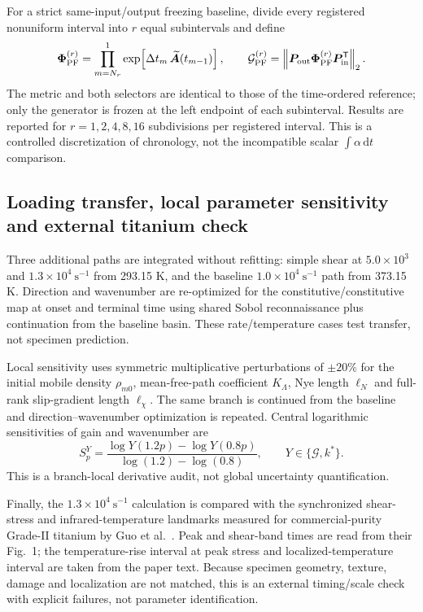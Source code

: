 For a strict same-input/output freezing baseline, divide every registered
nonuniform interval into $r$ equal subintervals and define
\begin{equation}
 \boldsymbol\Phi_{\rm PF}^{(r)}
 =\prod_{m=N_r}^{1}
 \exp\!\left[\Delta t_m\,
 \widetilde{\boldsymbol A}(t_{m-1})\right],
 \qquad
 \mathcal G_{\rm PF}^{(r)}
 =\left\|\boldsymbol P_{\rm out}
 \boldsymbol\Phi_{\rm PF}^{(r)}
 \boldsymbol P_{\rm in}^{\mathsf T}\right\|_2 .
 \label{eq:ft_piecewise_frozen_same_selector}
\end{equation}
The metric and both selectors are identical to those of the time-ordered
reference; only the generator is frozen at the left endpoint of each
subinterval.  Results are reported for $r=1,2,4,8,16$ subdivisions per
registered interval.  This is a
controlled discretization of chronology, not the incompatible scalar
$\int\alpha\,\mathrm dt$ comparison.

\subsection{Loading transfer, local parameter sensitivity and external titanium check}

Three additional paths are integrated without refitting: simple shear at
$5.0\times10^3$ and $1.3\times10^4~\mathrm{s^{-1}}$ from 293.15 K, and the
baseline $1.0\times10^4~\mathrm{s^{-1}}$ path from 373.15 K. Direction and wavenumber are
re-optimized for the constitutive/constitutive map at onset and terminal time
using shared Sobol reconnaissance plus continuation from the baseline basin.
These rate/temperature cases test transfer, not specimen prediction.

Local sensitivity uses symmetric multiplicative perturbations of $\pm20\%$
for the initial mobile density $\rho_{m0}$, mean-free-path coefficient
$K_\Lambda$, Nye length $\ell_N$ and full-rank slip-gradient length
$\ell_\chi$.  The same branch is continued from the baseline and
direction--wavenumber optimization is repeated.  Central logarithmic
sensitivities of gain and wavenumber are
\begin{equation}
 S_p^Y=\frac{\log Y(1.2p)-\log Y(0.8p)}
 {\log(1.2)-\log(0.8)},
 \qquad Y\in\{\mathcal G,k^*\}.
 \label{eq:ft_local_log_sensitivity}
\end{equation}
This is a branch-local derivative audit, not global uncertainty
quantification.

Finally, the $1.3\times10^4~\mathrm{s^{-1}}$ calculation is compared with the
synchronized shear-stress and infrared-temperature landmarks measured for
commercial-purity Grade-II titanium by Guo et al.\ \cite{GuoEtAl2019PRL}.
Peak and shear-band times are read from their Fig.~1; the temperature-rise
interval at peak stress and localized-temperature interval are taken from the
paper text.  Because specimen geometry, texture, damage and localization are
not matched, this is an external timing/scale check with explicit failures,
not parameter identification.

